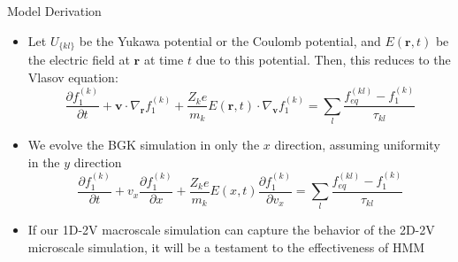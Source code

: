 \documentclass{beamer}
\begin{document}
			\begin{frame}{Model Derivation}
			\begin{itemize}
	\item Let $U_{\{kl\}}$ be the Yukawa potential or the Coulomb potential, and $E(\mathbf{r},t)$ be the electric field at $\mathbf{r}$ at time $t$ due to this potential. Then, this reduces to the Vlasov equation:
			\begin{equation*}
			\frac{\partial f_1^{(k)}}{\partial t}+\mathbf{v}\cdot\nabla_\mathbf{r}f_1^{(k)}+\frac{Z_k e}{m_k}E(\mathbf{r},t)\cdot\nabla_\mathbf{v} f_1^{(k)}=\sum_l\frac{f_{eq}^{(kl)}-f_1^{(k)}}{\tau_{kl}}
			\end{equation*}
			
			\item We evolve the BGK simulation in only the $x$ direction, assuming uniformity in the $y$ direction\begin{equation*}
			\frac{\partial f_1^{(k)}}{\partial t}+v_x\frac{\partial f_1^{(k)}}{\partial x}+\frac{Z_k e}{m_k}E(x,t)\frac{\partial f_1^{(k)}}{\partial v_x}=\sum_l\frac{f_{eq}^{(kl)}-f_1^{(k)}}{\tau_{kl}}
			\end{equation*}
			\item If our 1D-2V macroscale simulation can capture the behavior of the 2D-2V microscale simulation, it will be a testament to the effectiveness of HMM
\end{itemize}
	\end{frame}
	
\end{document}
